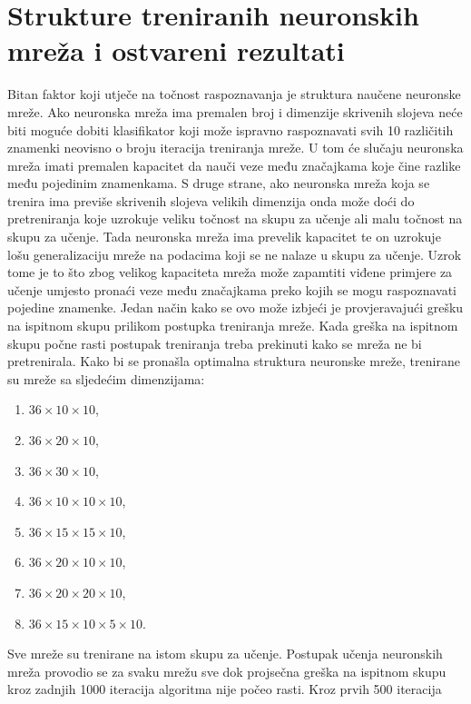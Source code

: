 \section{Strukture treniranih neuronskih mreža i ostvareni rezultati}
\label{sec:strukture-treniranih-neuronskih-mreza-i-ostvareni-rezultati}
Bitan faktor koji utječe na točnost raspoznavanja je struktura naučene neuronske mreže. Ako neuronska mreža ima premalen
broj i dimenzije skrivenih slojeva neće biti moguće dobiti klasifikator koji može ispravno raspoznavati svih 10
različitih znamenki neovisno o broju iteracija treniranja mreže. U tom će slučaju neuronska mreža imati premalen
kapacitet da nauči veze među značajkama koje čine razlike među pojedinim znamenkama. S druge strane, ako neuronska mreža
koja se trenira ima previše skrivenih slojeva velikih dimenzija onda može doći do pretreniranja koje uzrokuje veliku
točnost na skupu za učenje ali malu točnost na skupu za učenje. Tada neuronska mreža ima prevelik kapacitet te on
uzrokuje lošu generalizaciju mreže na podacima koji se ne nalaze u skupu za učenje. Uzrok tome je to što zbog velikog
kapaciteta mreža može zapamtiti viđene primjere za učenje umjesto pronaći veze među značajkama preko kojih se mogu
raspoznavati pojedine znamenke. Jedan način kako se ovo može izbjeći je provjeravajući grešku na ispitnom skupu prilikom
postupka treniranja mreže. Kada greška na ispitnom skupu počne rasti postupak treniranja treba prekinuti kako se mreža
ne bi pretrenirala. Kako bi se pronašla optimalna struktura neuronske mreže, trenirane su mreže sa sljedećim
dimenzijama:
\begin{enumerate}
    \item $36 \times 10 \times 10$,
    \item $36 \times 20 \times 10$,
    \item $36 \times 30 \times 10$,
    \item $36 \times 10 \times 10 \times 10$,
    \item $36 \times 15 \times 15 \times 10$,
    \item $36 \times 20 \times 10 \times 10$,
    \item $36 \times 20 \times 20 \times 10$,
    \item $36 \times 15 \times 10 \times 5 \times 10$.
\end{enumerate}
Sve mreže su trenirane na istom skupu za učenje. Postupak učenja neuronskih mreža provodio se za svaku mrežu sve dok
projsečna greška na ispitnom skupu kroz zadnjih 1000 iteracija algoritma nije počeo rasti. Kroz prvih 500 iteracija
